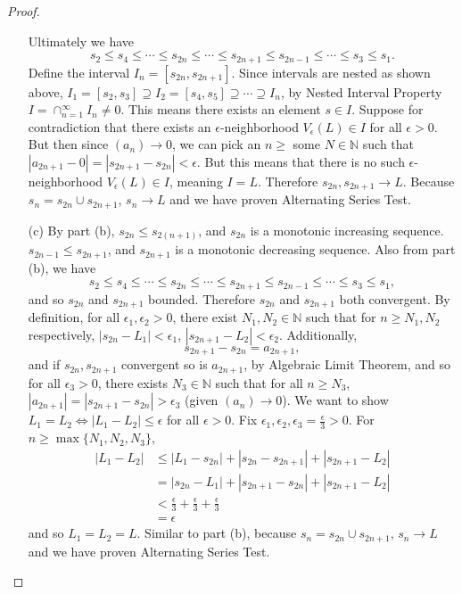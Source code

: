 \documentclass[11pt,twoside, reqno]{amsart}
\theoremstyle{remark}
\def\N{\mathbb N}
\renewcommand{\iff}{\Leftrightarrow}
\begin{document}
\begin{proof}
\begin{enumerate}
    Ultimately we have
    $$
        s_2 \leq s_4 \leq \cdots \leq s_{2n} \leq \cdots \leq s_{2n+1} \leq s_{2n-1} \leq \cdots \leq s_3 \leq s_1.
    $$
    Define the interval $I_n = [s_{2n},s_{2n+1}]$. Since intervals are nested as shown above, $I_1 = [s_2, s_3] \supseteq I_2 = [s_4, s_5] \supseteq \cdots \supseteq I_n$, by Nested Interval Property $I = \cap^\infty_{n=1} I_n \neq 0$. This means there exists an element $s \in I$. Suppose for contradiction that there exists an $\epsilon$-neighborhood $V_\epsilon(L) \in I$ for all $\epsilon > 0$. But then since $(a_n) \to 0$, we can pick an $n \geq$ some $N \in \N$ such that $|a_{2n+1} - 0| = |s_{2n+1} - s_{2n}| < \epsilon$. But this means that there is no such $\epsilon$-neighborhood $V_\epsilon(L) \in I$, meaning $I = {L}$. Therefore $s_{2n},s_{2n+1} \to L$. Because $s_n = s_{2n} \cup s_{2n+1}$, $s_n \to L$ and we have proven Alternating Series Test.
    \item [(c)] By part (b), $s_{2n} \leq s_{2(n+1)}$, and $s_{2n}$ is a monotonic increasing sequence. $s_{2n-1} \leq s_{2n+1}$, and $s_{2n+1}$ is a monotonic decreasing sequence. Also from part (b), we have
    $$
        s_2 \leq s_4 \leq \cdots \leq s_{2n} \leq \cdots \leq s_{2n+1} \leq s_{2n-1} \leq \cdots \leq s_3 \leq s_1,
    $$
    and so $s_{2n}$ and $s_{2n+1}$ bounded. Therefore $s_{2n}$ and $s_{2n+1}$ both convergent. By definition, for all $\epsilon_1, \epsilon_2 > 0$, there exist $N_1, N_2 \in \N$ such that for $n \geq N_1, N_2$ respectively, $|s_{2n} - L_1| < \epsilon_1$, $|s_{2n+1} - L_2| < \epsilon_2$. Additionally,
    $$
        s_{2n+1} - s_{2n} = a_{2n+1},
    $$
    and if $s_{2n}, s_{2n+1}$ convergent so is $a_{2n+1}$, by Algebraic Limit Theorem, and so for all $\epsilon_3 > 0$, there exists $N_3 \in \N$ such that for all $n \geq N_3$, $|a_{2n+1}| = |s_{2n+1} - s_{2n}| > \epsilon_3$ (given $(a_n) \to 0$). We want to show $L_1 = L_2 \iff |L_1 - L_2| \leq \epsilon$ for all $\epsilon > 0$. Fix $\epsilon_1,\epsilon_2,\epsilon_3 = \frac{\epsilon}{3} > 0$. For $n \geq \max\{N_1,N_2,N_3\}$,
    \begin{align*}
        |L_1 - L_2| &\leq |L_1 - s_{2n}| + |s_{2n} - s_{2n+1}| + |s_{2n+1} - L_2| \\
        &= |s_{2n} - L_1| + |s_{2n+1} - s_{2n}| + |s_{2n+1} - L_2| \\
        &< \frac{\epsilon}{3} + \frac{\epsilon}{3} + \frac{\epsilon}{3} \\
        &= \epsilon
    \end{align*}
    and so $L_1 = L_2 = L$. Similar to part (b), because $s_n = s_{2n} \cup s_{2n+1}$, $s_n \to L$ and we have proven Alternating Series Test.
\end{enumerate}
\end{proof}
\end{document}
